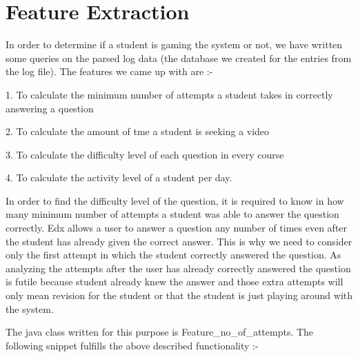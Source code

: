 \documentclass[a4paper,12pt,oneside]{sphinxmanual}
\begin{document}
\chapter{Feature Extraction}
\label{document:feature-extraction}
In order to determine if a student is gaming the system or not, we have written some queries on the parsed log data (the database we created for the entries from the log file). The features we came up with are :-

\begin{DUlineblock}{0em}
\item[] 1. To calculate the minimum number of attempts a student takes in correctly answering a question
\item[] 2. To calculate the amount of tme a student is seeking a video
\item[] 3. To calculate the difficulty level of each question in every course
\item[] 4. To calculate the activity level of a student per day.
\end{DUlineblock}

In order to find the difficulty level of the question, it is required to know in how many minimum number of attempts a student was able to answer the question correctly. Edx allows a user to answer a question any number of times even after the student has already given the correct answer. This is why we need to consider only the first attempt in which the student correctly answered the question. As analyzing the attempts after the user has already correctly answered the question is futile because student already knew the answer and those extra attempts will only mean revision for the student or that the student is just playing around with the system.

The java class written for this purpose is Feature\_no\_of\_attempts. The following snippet fulfills the above described functionality :-
\end{document}

